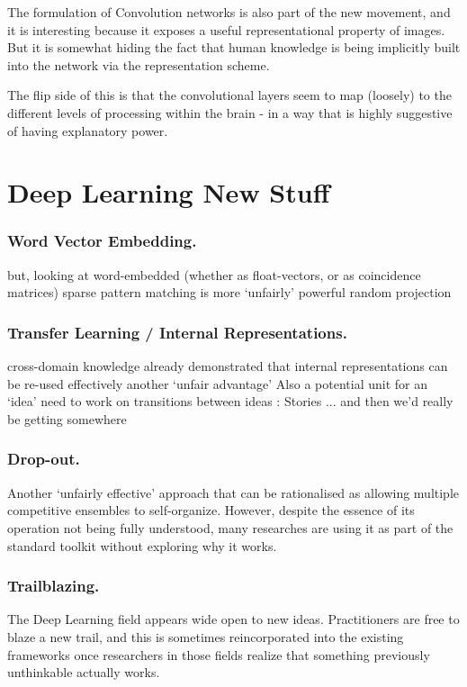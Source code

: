 \documentclass[citeauthoryear]{llncs}
\begin{document}
The formulation of Convolution networks is also part of the new movement, 
and it is interesting because it exposes a useful representational property of images.  
But it is somewhat hiding the fact that human knowledge is being implicitly 
built into the network via the representation scheme.

The flip side of this is that the convolutional layers seem to 
map (loosely) to the different levels of processing within the brain - 
in a way that is highly suggestive of having explanatory power.

 
\section{Deep Learning New Stuff}

\subsubsection*{Word Vector Embedding.}

    but, looking at word-embedded (whether as float-vectors, or as coincidence matrices)
      sparse pattern matching is more `unfairly' powerful 
      random projection

\subsubsection*{Transfer Learning / Internal Representations.}
  cross-domain knowledge
    already demonstrated that internal representations can be re-used effectively
    another `unfair advantage'
  Also a potential unit for an `idea'
    need to work on transitions between ideas : Stories
      ... and then we'd really be getting somewhere


\subsubsection*{Drop-out.}
Another `unfairly effective' approach that can be rationalised as allowing 
multiple competitive ensembles to self-organize.  However, 
despite the essence of its operation not being fully understood, 
many researches are using it as part of the standard toolkit without 
exploring why it works.


\subsubsection*{Trailblazing.}
The Deep Learning field appears wide open to new ideas.  
Practitioners are free to blaze a new trail, and this is sometimes 
reincorporated into the existing frameworks once researchers in those 
fields realize that something previously unthinkable actually works.
\end{document}
